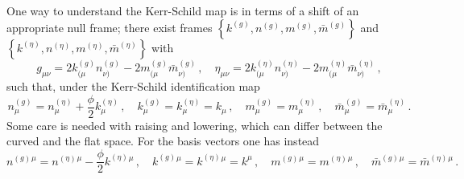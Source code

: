 One way to understand the Kerr-Schild map is in terms of a shift of an appropriate null frame; there exist frames $\left\lbrace  k^{(g)},  n^{(g)}, m^{(g)}, \bar{m}^{(g)}\right \rbrace$ and $\left\lbrace  k^{(\eta)},  n^{(\eta)}, m^{(\eta)}, \bar{m}^{(\eta)}\right \rbrace$ with
\begin{equation}\label{Penrose:eqn:NPframemetric}
g_{\mu \nu} = 2k^{(g)}_{(\mu} n^{(g)}_{\nu)} - 2m^{(g)}_{(\mu} \bar{m}^{(g)}_{\nu)} \, , \quad  	\eta_{\mu \nu} =2k^{(\eta)}_{(\mu} n^{(\eta)}_{\nu)} - 2m^{(\eta)}_{(\mu} \bar{m}^{(\eta)}_{\nu)} \, ,
\end{equation}
such that, under the Kerr-Schild identification map
\begin{equation}\label{Penrose:eqn:KSmap}
n^{(g)}_{\mu}= n^{(\eta)}_{\mu} + \frac{\phi}{2} k^{(\eta)}_{\mu} \, , \quad  k^{(g)}_{\mu} = k^{(\eta)}_{\mu} = k_{\mu} \, , \quad m^{(g)}_{\mu} = m^{(\eta)}_{\mu} \, , \quad \bar{m}^{(g)}_{\mu} = \bar{m}^{(\eta)}_{\mu}   \, .
\end{equation}
Some care is needed with raising and lowering, which can differ between the curved and the flat space. For the basis vectors one has instead
\begin{equation}\label{Penrose:eqn:frameshift}
n^{(g)}{}^{\mu}= n^{(\eta)}{}^{\mu} - \frac{\phi}{2} k^{(\eta)}{}^{\mu} \, , \quad  k^{(g)}{}^{\mu} = k^{(\eta)}{}^{\mu} = k^{\mu} \, , \quad m^{(g)}{}^{\mu} = m^{(\eta)}{}^{\mu} \, , \quad \bar{m}^{(g)}{}^{\mu} = \bar{m}^{(\eta)}{}^{\mu}   \, .
\end{equation}

